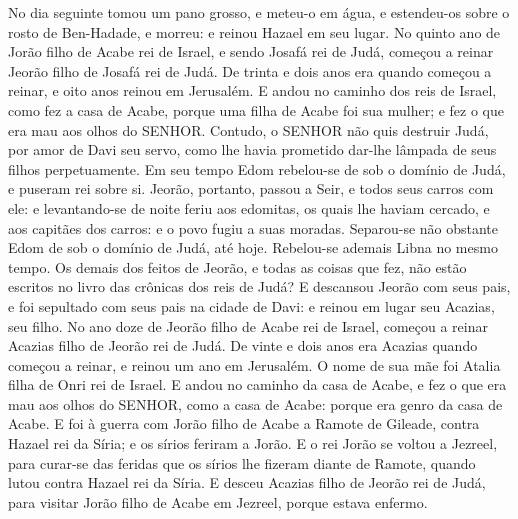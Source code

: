 {  No dia seguinte tomou um pano grosso, e meteu-o em água, e estendeu-os sobre o rosto de Ben-Hadade, e morreu: e reinou Hazael em seu lugar.
  No quinto ano de Jorão filho de Acabe rei de Israel, e sendo Josafá rei de Judá, começou a reinar Jeorão filho de Josafá rei de Judá.
  De trinta e dois anos era quando começou a reinar, e oito anos reinou em Jerusalém.
  E andou no caminho dos reis de Israel, como fez a casa de Acabe, porque uma filha de Acabe foi sua mulher; e fez o que era mau aos olhos do SENHOR.
  Contudo, o SENHOR não quis destruir Judá, por amor de Davi seu servo, como lhe havia prometido dar-lhe lâmpada de seus filhos perpetuamente.
  Em seu tempo Edom rebelou-se de sob o domínio de Judá, e puseram rei sobre si.
  Jeorão, portanto, passou a Seir, e todos seus carros com ele: e levantando-se de noite feriu aos edomitas, os quais lhe haviam cercado, e aos capitães dos carros: e o povo fugiu a suas moradas.
  Separou-se não obstante Edom de sob o domínio de Judá, até hoje. Rebelou-se ademais Libna no mesmo tempo.
  Os demais dos feitos de Jeorão, e todas as coisas que fez, não estão escritos no livro das crônicas dos reis de Judá?
  E descansou Jeorão com seus pais, e foi sepultado com seus pais na cidade de Davi: e reinou em lugar seu Acazias, seu filho.
  No ano doze de Jeorão filho de Acabe rei de Israel, começou a reinar Acazias filho de Jeorão rei de Judá.
  De vinte e dois anos era Acazias quando começou a reinar, e reinou um ano em Jerusalém. O nome de sua mãe foi Atalia filha de Onri rei de Israel.
  E andou no caminho da casa de Acabe, e fez o que era mau aos olhos do SENHOR, como a casa de Acabe: porque era genro da casa de Acabe.
  E foi à guerra com Jorão filho de Acabe a Ramote de Gileade, contra Hazael rei da Síria; e os sírios feriram a Jorão.
  E o rei Jorão se voltou a Jezreel, para curar-se das feridas que os sírios lhe fizeram diante de Ramote, quando lutou contra Hazael rei da Síria. E desceu Acazias filho de Jeorão rei de Judá, para visitar Jorão filho de Acabe em Jezreel, porque estava enfermo.
\par }

